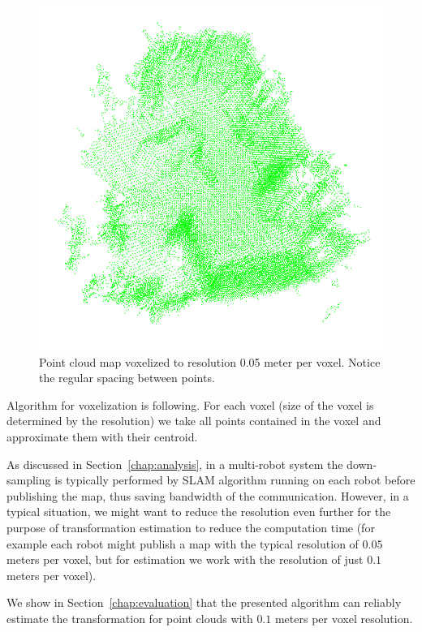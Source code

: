 \begin{figure}
    \centering
    \includegraphics[width=\textwidth]{../img/v1-downsampled.png}
    \caption[Voxelized point cloud map]{Point cloud map voxelized to resolution 0.05 meter per voxel. Notice the regular spacing between points.}
    \label{fig:v1-downsampled}
\end{figure}

Algorithm for voxelization is following. For each voxel (size of the voxel is determined by the resolution) we take all points contained in the voxel and approximate them with their centroid.

As discussed in Section~\ref{chap:analysis}, in a multi-robot system the down-sampling is typically performed by \gls{SLAM} algorithm running on each robot before publishing the map, thus saving bandwidth of the communication. However, in a typical situation, we might want to reduce the resolution even further for the purpose of transformation estimation to reduce the computation time (for example each robot might publish a map with the typical resolution of $0.05$ meters per voxel, but for estimation we work with the resolution of just $0.1$ meters per voxel).

We show in Section~\ref{chap:evaluation} that the presented algorithm can reliably estimate the transformation for point clouds with $0.1$ meters per voxel resolution.

